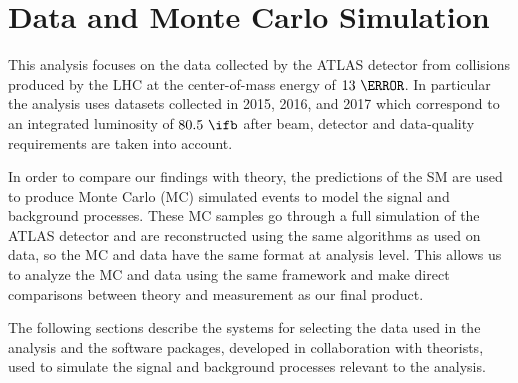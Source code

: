 \chapter{Data and Monte Carlo Simulation} \label{chap:data}

This analysis focuses on the data collected by the ATLAS detector from \pp
collisions produced by the LHC at the center-of-mass energy of $13~\TeV$.  In
particular the analysis uses datasets collected in 2015, 2016, and 2017 which
correspond to an integrated luminosity of $80.5~\ifb$ after beam, detector and
data-quality requirements are taken into account. 

In order to compare our findings with theory, the predictions of the SM are used
to produce Monte Carlo (MC) simulated events to model the signal and background
processes.  These MC samples go through a full simulation of the ATLAS detector
and are reconstructed using the same algorithms as used on data, so the MC and
data have the same format at analysis level. This allows us to analyze the MC
and data using the same framework and make direct comparisons between theory
and measurement as our final product.

The following sections describe the systems for selecting the data used in the
analysis and the software packages, developed in collaboration with theorists,
used to simulate the signal and background processes relevant to the analysis.




